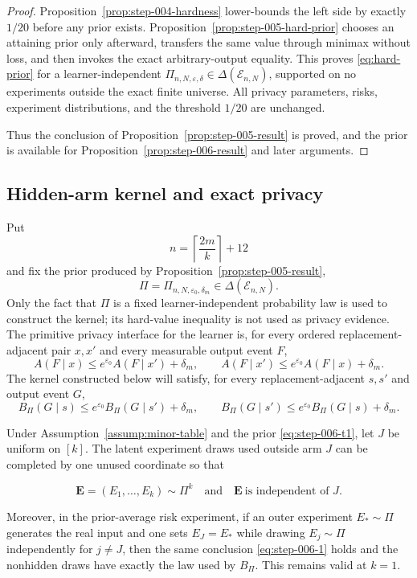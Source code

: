 \begin{proof}
Proposition~\ref{prop:step-004-hardness} lower-bounds the left side by exactly \(1/20\) before any prior exists. Proposition~\ref{prop:step-005-hard-prior} chooses an attaining prior only afterward, transfers the same value through minimax without loss, and then invokes the exact arbitrary-output equality. This proves \eqref{eq:hard-prior} for a learner-independent
\(\Pi_{n,N,\varepsilon,\delta}\in\Delta(\mathcal E_{n,N})\), supported on no experiments outside the exact finite universe. All privacy parameters, risks, experiment distributions, and the threshold \(1/20\) are unchanged.

Thus the conclusion of Proposition~\ref{prop:step-005-result} is proved, and the prior is available for Proposition~\ref{prop:step-006-result} and later arguments.

\end{proof}

\subsection{Hidden-arm kernel and exact privacy}
\label{app:step-006}

Put
\[
n=\left\lceil\frac{2m}{k}\right\rceil+12
\]
and fix the prior produced by Proposition~\ref{prop:step-005-result},
\[
\Pi=\Pi_{n,N,\varepsilon_0,\delta_m}
\in\Delta(\mathcal E_{n,N}).
\tag{T1}\label{eq:step-006-t1}
\]
Only the fact that $\Pi$ is a fixed learner-independent probability law
is used to construct the kernel; its hard-value inequality is not used as
privacy evidence.
The primitive privacy interface for the learner is, for every ordered
replacement-adjacent pair $x,x'$ and every measurable output event $F$,
\[
A(F\mid x)\leq e^{\varepsilon_0}A(F\mid x')+\delta_m,
\qquad
A(F\mid x')\leq e^{\varepsilon_0}A(F\mid x)+\delta_m.
\tag{C1}\label{eq:step-006-c1}
\]
The kernel constructed below will satisfy, for every replacement-adjacent
$s,s'$ and output event $G$,
\[
B_\Pi(G\mid s)\leq e^{\varepsilon_0}B_\Pi(G\mid s')+\delta_m,
\qquad
B_\Pi(G\mid s')\leq e^{\varepsilon_0}B_\Pi(G\mid s)+\delta_m.
\tag{T2}\label{eq:step-006-t2}
\]



\begin{lemma}
\label{lem:step-006-iid-latents}

Under Assumption~\ref{assump:minor-table} and the prior \eqref{eq:step-006-t1}, let \(J\) be uniform on \([k]\). The latent experiment draws used outside arm \(J\) can be completed by one unused coordinate so that

\[
\mathbf E=(E_1,\ldots,E_k)\sim\Pi^k
\quad\text{and}\quad
\mathbf E\ \text{is independent of }J.
\tag{1}\label{eq:step-006-1}
\]

Moreover, in the prior-average risk experiment, if an outer experiment \(E_* \sim \Pi\) generates the real input and one sets \(E_J=E_*\) while drawing \(E_j \sim \Pi\) independently for \(j\ne J\), then the same conclusion \eqref{eq:step-006-1} holds and the nonhidden draws have exactly the law used by \(B_\Pi\). This remains valid at \(k=1\).

\end{lemma}

